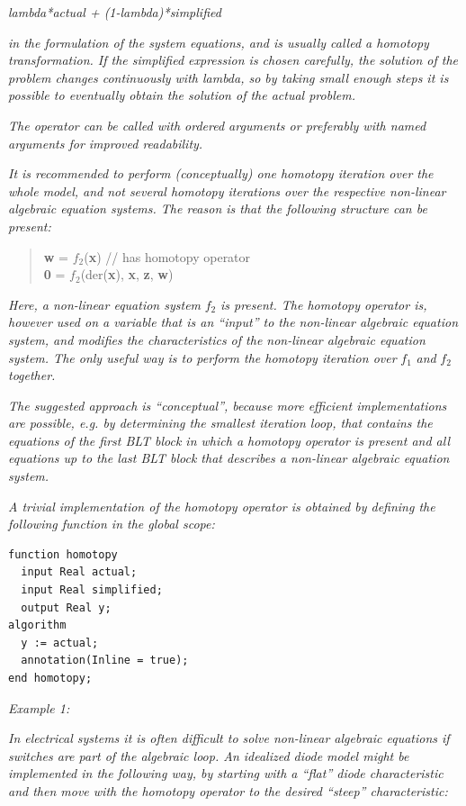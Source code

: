 \documentclass[10pt,a4paper]{report}
\begin{document}
\emph{lambda*actual + (1-lambda)*simplified}

\emph{in the formulation of the system equations, and is usually called
a homotopy transformation. If the simplified expression is chosen
carefully, the solution of the problem changes continuously with lambda,
so by taking small enough steps it is possible to eventually obtain the
solution of the actual problem.}

\emph{The operator can be called with ordered arguments or preferably
with named arguments for improved readability.}

\emph{It is recommended to perform (conceptually) one homotopy iteration
over the whole model, and not several homotopy iterations over the
respective non-linear algebraic equation systems. The reason is that the
following structure can be present:}

\begin{quote}
\textbf{w} = $f_2$(\textbf{x}) // has homotopy
operator\\
\textbf{0} = $f_2$(der(\textbf{x}), \textbf{x},
\textbf{z}, \textbf{w})
\end{quote}

\emph{Here, a non-linear equation system} $f_2$
\emph{is present. The homotopy operator is, however used on a variable
that is an ``input'' to the non-linear algebraic equation system, and
modifies the characteristics of the non-linear algebraic equation
system. The only useful way is to perform the homotopy iteration over}
$f_1$ \emph{and} $f_2$
\emph{together.}

\emph{The suggested approach is ``conceptual'', because more efficient
implementations are possible, e.g. by determining the smallest iteration
loop, that contains the equations of the first BLT block in which a
homotopy operator is present and all equations up to the last BLT block
that describes a non-linear algebraic equation system.}

\emph{A trivial implementation of the homotopy operator is obtained by
defining the following function in the global scope:}

\begin{lstlisting}[language=modelica]
function homotopy
  input Real actual;
  input Real simplified;
  output Real y;
algorithm
  y := actual;
  annotation(Inline = true);
end homotopy;
\end{lstlisting}
\emph{Example 1:}

\emph{In electrical systems it is often difficult to solve non-linear
algebraic equations if switches are part of the algebraic loop. An
idealized diode model might be implemented in the following way, by
starting with a ``flat'' diode characteristic and then move with the
homotopy operator to the desired ``steep'' characteristic:}
\end{document}
